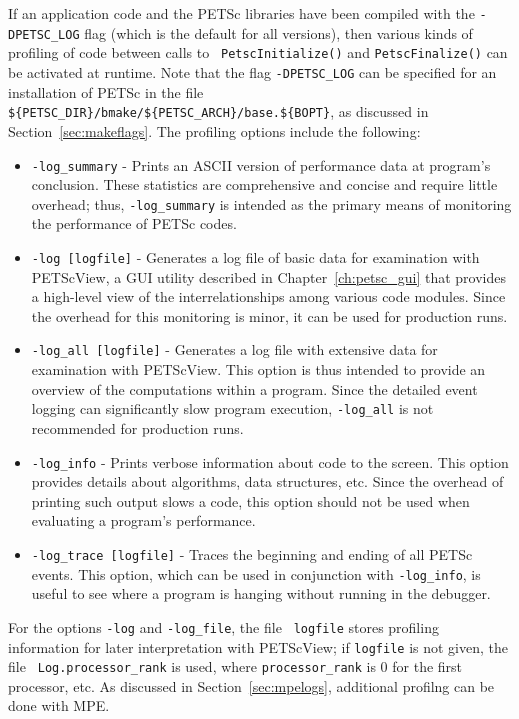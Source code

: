 If an application code and the PETSc libraries have been compiled with
the {\tt -DPETSC\_LOG} flag (which is the default for all versions),
then various kinds of profiling of code between calls to {\tt
PetscInitialize()} and {\tt PetscFinalize()} can be 
activated at runtime.  Note that the flag {\tt -DPETSC\_LOG} can be
specified for an installation of PETSc in the file {\tt
\$\{PETSC\_DIR\}/bmake/\$\{PETSC\_ARCH\}/base.\$\{BOPT\}}, as discussed in
Section~\ref{sec:makeflags}.  The profiling options include the following:
   
\begin{itemize}
\item {\tt -log\_summary} - Prints an ASCII version of performance data
     at program's conclusion. These statistics are comprehensive and concise
     and require little overhead; thus, {\tt -log\_summary} is intended as
     the primary means of monitoring the performance of PETSc codes.
\item {\tt -log [logfile]} - Generates a log file of basic data for examination
     with PETScView, a GUI utility described in Chapter~\ref{ch:petsc_gui}
     that provides a high-level view of the interrelationships
     among various code modules.  Since the overhead for this monitoring is minor,
     it can be used for production runs.  
\item {\tt -log\_all [logfile]} - Generates a log file with extensive data
     for examination with PETScView.  This option is thus intended to
     provide an overview of the computations within a program.  Since the
     detailed event logging can significantly slow program execution, 
     {\tt -log\_all} is not recommended for production runs.
\item {\tt -log\_info} - Prints verbose information about code to the screen. 
     This option provides details about algorithms, data structures, etc.
     Since the overhead of printing such output slows a code, this
     option should not be used when evaluating a program's performance.
\item {\tt -log\_trace [logfile]} - Traces the beginning and ending of all
     PETSc events.  This option, which can be used in conjunction with 
     {\tt -log\_info}, is useful to see where a program is hanging
     without running in the debugger.  
\end{itemize}
For the options {\tt -log} and {\tt -log\_file}, the file {\tt
logfile} stores profiling information for later interpretation with
PETScView; if {\tt logfile} is not given, the file {\tt
Log.processor\_rank} is used, where {\tt processor\_rank} is 0 for the
first processor, etc.  As discussed in Section~\ref{sec:mpelogs},
additional profilng can be done with MPE.

